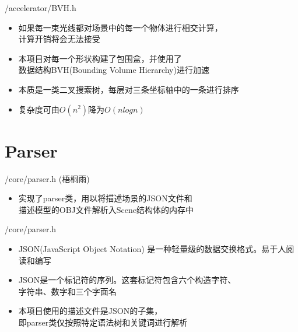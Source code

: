 \documentclass{beamer}
\begin{document}
\begin{frame} {/accelerator/BVH.h}
\begin{itemize}
\item 如果每一束光线都对场景中的每一个物体进行相交计算，\\ 计算开销将会无法接受
\item 本项目对每一个形状构建了包围盒，并使用了\\数据结构BVH(Bounding Volume Hierarchy)进行加速
\item 本质是一类二叉搜索树，每层对三条坐标轴中的一条进行排序
\item 复杂度可由$O(n^2)$降为$O(n log n)$
\end{itemize}
\end{frame}

\section{Parser}
\begin{frame} {/core/parser.h (梧桐雨)}
\begin{itemize}
\item 实现了parser类，用以将描述场景的JSON文件和 \\ 描述模型的OBJ文件解析入Scene结构体的内存中
\end{itemize}
\end{frame}

\begin{frame} {/core/parser.h}
\begin{itemize}
\item JSON(JavaScript Object Notation) 是一种轻量级的数据交换格式。易于人阅读和编写
\item JSON是一个标记符的序列。这套标记符包含六个构造字符、\\ 字符串、数字和三个字面名
\item 本项目使用的描述文件是JSON的子集，\\ 即parser类仅按照特定语法树和关键词进行解析
\end{itemize}
\end{frame}
\end{document}
